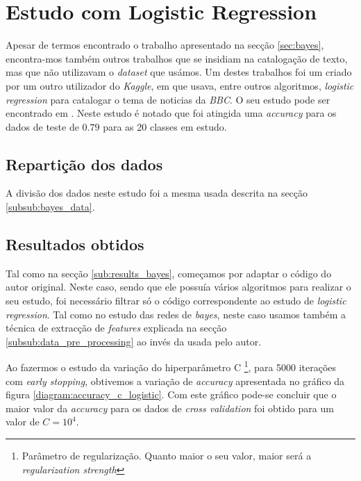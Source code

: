\section{Estudo com Logistic Regression}

Apesar de termos encontrado o trabalho apresentado na secção \ref{sec:bayes}, encontra-mos também outros trabalhos que se insidiam na catalogação de texto, mas que não utilizavam o \textit{dataset} que usámos. Um destes trabalhos foi um criado por um outro utilizador do \textit{Kaggle}, em que usava, entre outros algoritmos, \textit{logistic regression} para catalogar o tema de noticias da \textit{BBC}. O seu estudo pode ser encontrado em \cite{kaggle_logistic}. Neste estudo é notado que foi atingida uma \textit{accuracy} para os dados de teste de $0.79$ para as 20 classes em estudo.

\subsection{Repartição dos dados}
A divisão dos dados neste estudo foi a mesma usada descrita na secção \ref{subsub:bayes_data}.


\subsection{Resultados obtidos}

Tal como na secção \ref{sub:results_bayes}, começamos por adaptar o código do autor original. Neste caso, sendo que ele possuía vários algoritmos para realizar o seu estudo, foi necessário filtrar só o código correspondente ao estudo de \textit{logistic regression}. Tal como no estudo das redes de \textit{bayes}, neste caso usamos também a técnica de extracção de \textit{features} explicada na secção \ref{subsub:data_pre_processing} ao invés da usada pelo autor.

Ao fazermos o estudo da variação do hiperparâmetro C \footnote{Parâmetro de regularização. Quanto maior o seu valor, maior será a \textit{regularization strength}}, para 5000 iterações com \textit{early stopping}, obtivemos a variação de \textit{accuracy} apresentada no gráfico da figura \ref{diagram:accuracy_c_logistic}. Com este gráfico pode-se concluir que o maior valor da \textit{accuracy} para os dados de \textit{cross validation} foi obtido para um valor de $C = 10^{4}$.

